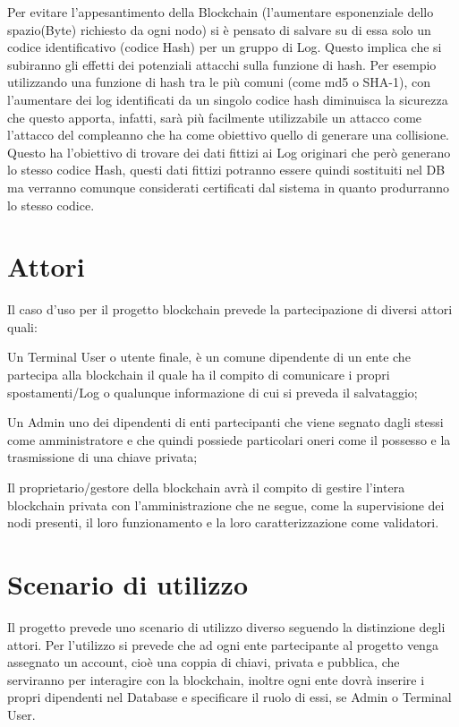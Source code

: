 \documentclass[11pt,a4paper,titlepage]{report}
\begin{document}
Per evitare l'appesantimento della Blockchain (l'aumentare esponenziale dello spazio(Byte) richiesto da ogni nodo) si è pensato di salvare su di essa solo un codice identificativo (codice Hash) per un gruppo di Log. Questo implica che si subiranno gli effetti dei potenziali attacchi sulla funzione di hash. Per esempio utilizzando una funzione di hash tra le più comuni (come md5 o SHA-1), con l'aumentare dei log identificati da un singolo codice hash diminuisca la sicurezza che questo apporta, infatti, sarà più facilmente utilizzabile un attacco come l'attacco del compleanno che ha come obiettivo quello di generare una collisione. Questo ha l'obiettivo di trovare dei dati fittizi ai Log originari che però generano lo stesso codice Hash, questi dati fittizi potranno essere quindi sostituiti nel DB ma verranno comunque considerati certificati dal sistema in quanto produrranno lo stesso codice.

\section{Attori}
Il caso d'uso per il progetto blockchain prevede la partecipazione di diversi attori quali: 

Un Terminal User o utente finale, è un comune dipendente di un ente che partecipa alla blockchain il quale ha il compito di comunicare i propri spostamenti/Log o qualunque informazione di cui si preveda il salvataggio;

Un Admin uno dei dipendenti di enti partecipanti che viene segnato dagli stessi come amministratore e che quindi possiede  particolari oneri come il possesso e la trasmissione di una chiave privata;

Il proprietario/gestore della blockchain avrà il compito di gestire l'intera blockchain privata con l'amministrazione che ne segue, come la supervisione dei nodi presenti, il loro funzionamento e la loro caratterizzazione come validatori. 

\section{Scenario di utilizzo}
Il progetto prevede uno scenario di utilizzo diverso seguendo la distinzione degli attori.
Per l'utilizzo si prevede che ad ogni ente partecipante al progetto venga assegnato un account, cioè una coppia di chiavi, privata e pubblica, che serviranno per interagire con la blockchain, inoltre ogni ente dovrà inserire i propri dipendenti nel Database e specificare il ruolo di essi, se Admin o Terminal User.
\end{document}
